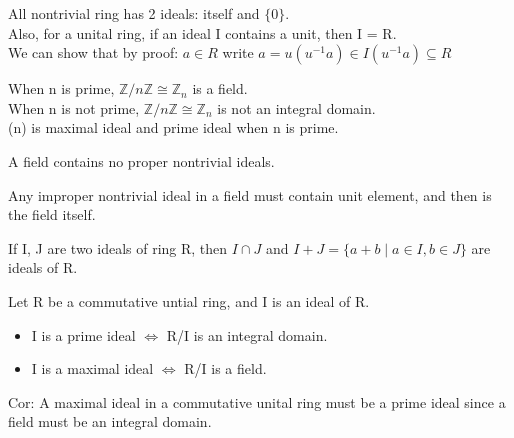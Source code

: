\documentclass{article}
\newcommand\Z{\ensuremath{\mathbb{Z}}}
\begin{document}
\begin{note}
    All nontrivial ring has 2 ideals: itself and $\{0\}$.
    \\Also, for a unital ring, if an ideal I contains a unit, then I = R.
    \\We can show that by proof: $a \in R$ write $a = u(u^{-1}a) \in I(u^{-1}a) \subseteq R$
    
\end{note}
\begin{Example}
    When n is prime, $\Z/n\Z \cong \Z_n$ is a field.
    \\ When n is not prime,  $\Z/n\Z \cong \Z_n$ is not an integral domain.
    \\(n) is maximal ideal and prime ideal when n is prime. 
\end{Example}
\begin{theorem}
    A field contains no proper nontrivial ideals. 
\end{theorem}
\begin{Proof}
    Any improper nontrivial ideal in a field must contain unit element, and then is the field itself. 
\end{Proof}
\begin{theorem}
    If I, J are two ideals of ring R, then $I \cap J$ and $I+J = \{ a+b \mid a \in I, b \in J \}$ are ideals of R. 
\end{theorem}
\begin{theorem}
    Let R be a commutative untial ring, and I is an ideal of R.
    \begin{itemize}
        \item I is a prime ideal $\Leftrightarrow$ R/I is an integral domain.
        \item I is a maximal ideal $\Leftrightarrow$ R/I is a field.
        
    \end{itemize}
    Cor: A maximal ideal in a commutative unital ring must be a prime ideal since a field must be an integral domain. 
\end{theorem}
\end{document}
